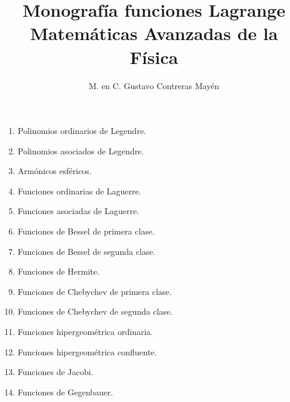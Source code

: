 
\title{Monografía funciones Lagrange \\ \large {Matemáticas Avanzadas de la Física} \vspace{-3ex}}
\author{M. en C. Gustavo Contreras Mayén}
\date{ }

\maketitle
\fontsize{14}{14}\selectfont
\renewcommand\arraystretch{2}

\begin{enumerate}
\item Polinomios ordinarios de Legendre.
\item Polinomios asociados de Legendre.
\item Armónicos esféricos.
\item Funciones ordinarias de Laguerre.
\item Funciones asociadas de Laguerre.
\item Funciones de Bessel de primera clase.
\item Funciones de Bessel de segunda clase.
\item Funciones de Hermite.
\item Funciones de Chebychev de primera clase.
\item Funciones de Chebychev de segunda clase.
\item Funciones hipergeométrica ordinaria.
\item Funciones hipergeométrica confluente.
\item Funciones de Jacobi.
\item Funciones de Gegenbauer.
\end{enumerate}
